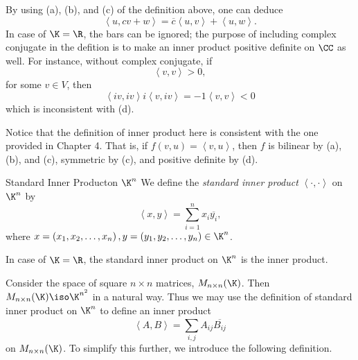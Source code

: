 \documentclass[linearalgebraII]{subfiles}
\begin{document}
    \begin{remark}
        By using (a), (b), and (c) of the definition above, one can deduce
        \begin{equation*}
            \left\langle u, cv+w\right\rangle  = \overline{c}\left\langle u, v\right\rangle  + \left\langle u, w\right\rangle  .
        \end{equation*}
        In case of $\K=\R$, the bars can be ignored; the purpose of including complex conjugate in the defition is to make an inner product positive definite on $\CC$ as well. For instance, without complex conjugate, if
        \begin{equation*}
            \left\langle v, v\right\rangle  > 0,
        \end{equation*}
        for some $v\in V$, then
        \begin{equation*}
            \left\langle iv, iv\right\rangle i\left\langle v, iv\right\rangle = -1\left\langle v, v\right\rangle < 0
        \end{equation*}
        which is inconsistent with (d).
    \end{remark}

    \begin{remark}
        Notice that the definition of inner product here is consistent with the one provided in Chapter 4. That is, if $f(v,u) = \left\langle v, u\right\rangle $, then $f$ is bilinear by (a), (b), and (c), symmetric by (c), and positive definite by (d).
    \end{remark}

    \clearpage
    \begin{definition}{Standard Inner Product}{on $\K^n$}
        We define the \emph{standard inner product} $\left\langle \cdot, \cdot\right\rangle $ on $\K^n$ by
        \begin{equation*}
            \left\langle x, y\right\rangle  = \sum^{n}_{i=1} x_i\overline{y_i},
        \end{equation*}
        where $x=\left( x_1,x_2,\ldots,x_n \right), y = \left( y_1,y_2,\ldots,y_n \right)\in\K^n$.
    \end{definition}

    \begin{remark}
        In case of $\K = \R$, the standard inner product on $\K^n$ is the inner product.
    \end{remark}

    \begin{remark}
        Consider the space of square $n\times n$ matrices, $M_{n\times n}(\K)$. Then $M_{n\times n}(\K)\iso\K^{n^2}$ in a natural way. Thus we may use the definition of standard inner product on $\K^n$ to define an inner product
        \begin{equation*}
            \left\langle A, B\right\rangle = \sum^{}_{i,j} A_{ij}\overline{B_{ij}}
        \end{equation*}
        on $M_{n\times n}(\K)$. To simplify this further, we introduce the following definition.
    \end{remark}
\end{document}
